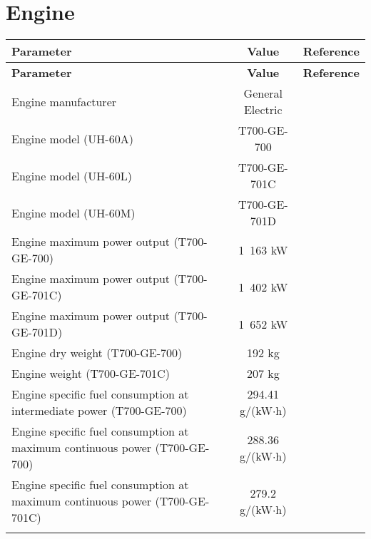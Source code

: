 \section{Engine}

\begin{tabularx}{\textwidth}{ | L | c | c | }
  \hline
  \textbf{Parameter}                    & \textbf{Value}   & \textbf{Reference} \\ \hline
  \endfirsthead
  \hline
  \textbf{Parameter}                    & \textbf{Value}   & \textbf{Reference} \\ \hline
  \endhead
  Engine manufacturer                   & General Electric & \cite{Janes20042005} \\ \hline
  Engine model (UH-60A)                 & T700-GE-700      & \cite{Janes20042005,UH60_OperatorsManual} \\ \hline
  Engine model (UH-60L)                 & T700-GE-701C     & \cite{Janes20042005,UH60_OperatorsManual} \\ \hline
  Engine model (UH-60M)                 & T700-GE-701D     & \cite{Janes20042005} \\ \hline
  Engine maximum power output (T700-GE-700)  & 1~163 kW    & \cite{Janes20042005} \\ \hline
  Engine maximum power output (T700-GE-701C) & 1~402 kW    & \cite{Janes20042005} \\ \hline
  Engine maximum power output (T700-GE-701D) & 1~652 kW    & \cite{Janes20042005} \\ \hline
  Engine dry weight (T700-GE-700)       & 192 kg           & \cite{Janes19841985} \\ \hline
  Engine weight (T700-GE-701C)          & 207 kg           & \cite{UH60_GE_T700_DataSheet} \\ \hline
  Engine specific fuel consumption at intermediate power (T700-GE-700) & 294.41 g/(kW$\cdot$h) & \cite{Janes19841985} \\ \hline
  Engine specific fuel consumption at maximum continuous power (T700-GE-700) & 288.36 g/(kW$\cdot$h) & \cite{Janes19841985} \\ \hline
  Engine specific fuel consumption at maximum continuous power (T700-GE-701C) & 279.2 g/(kW$\cdot$h) & \cite{UH60_GE_T700_DataSheet} \\ \hline
  \caption{Basic data}
\end{tabularx}
